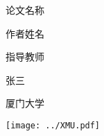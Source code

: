 \documentclass[UTF8]{ctexart}
\def\xmuspace{\hbox{}\vfill\hbox{}\par}
\begin{document}
\hspace{0.471\textwidth}
\noindent
    \begin{minipage}{0.85\ccwd} %
    \xmuspace
    论文名称
    \xmuspace
    作者姓名 
    \xmuspace
    指导教师 
    \xmuspace
    张三
    \xmuspace
    厦门大学
    \xmuspace
\end{minipage}
\begin{minipage}{0.5\textwidth}
    \texttt{[image: ../XMU.pdf]}
\end{minipage}%
\end{document}
